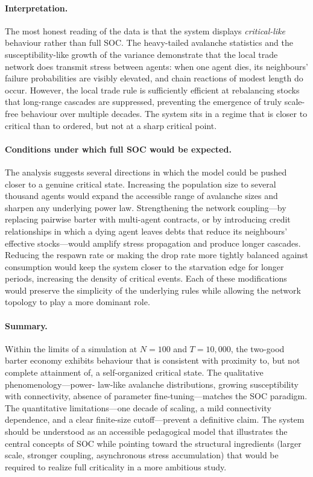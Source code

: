 \documentclass[11pt,a4paper]{article}
\begin{document}
\paragraph{Interpretation.} The most honest reading of the data is that
the system displays \emph{critical-like} behaviour rather than full SOC.
The heavy-tailed avalanche statistics and the susceptibility-like growth
of the variance demonstrate that the local trade network does transmit
stress between agents: when one agent dies, its neighbours' failure
probabilities are visibly elevated, and chain reactions of modest length
do occur. However, the local trade rule is sufficiently efficient at
rebalancing stocks that long-range cascades are suppressed, preventing
the emergence of truly scale-free behaviour over multiple decades. The
system sits in a regime that is closer to critical than to ordered, but
not at a sharp critical point.

\paragraph{Conditions under which full SOC would be expected.} The
analysis suggests several directions in which the model could be pushed
closer to a genuine critical state. Increasing the population size to
several thousand agents would expand the accessible range of avalanche
sizes and sharpen any underlying power law. Strengthening the network
coupling---by replacing pairwise barter with multi-agent contracts, or by
introducing credit relationships in which a dying agent leaves debts
that reduce its neighbours' effective stocks---would amplify stress
propagation and produce longer cascades. Reducing the respawn rate or
making the drop rate more tightly balanced against consumption would
keep the system closer to the starvation edge for longer periods,
increasing the density of critical events. Each of these modifications
would preserve the simplicity of the underlying rules while allowing the
network topology to play a more dominant role.

\paragraph{Summary.} Within the limits of a simulation at $N = 100$ and
$T = 10{,}000$, the two-good barter economy exhibits behaviour that is
consistent with proximity to, but not complete attainment of, a
self-organized critical state. The qualitative phenomenology---power-%
law-like avalanche distributions, growing susceptibility with
connectivity, absence of parameter fine-tuning---matches the SOC
paradigm. The quantitative limitations---one decade of scaling, a mild
connectivity dependence, and a clear finite-size cutoff---prevent a
definitive claim. The system should be understood as an accessible
pedagogical model that illustrates the central concepts of SOC while
pointing toward the structural ingredients (larger scale, stronger
coupling, asynchronous stress accumulation) that would be required to
realize full criticality in a more ambitious study.
\end{document}
